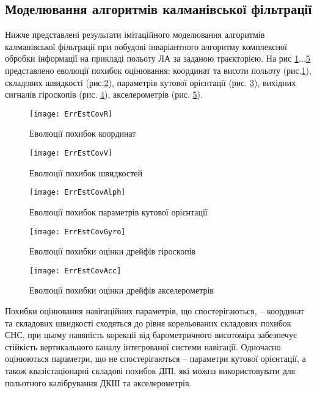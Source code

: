 \subsection{Моделювання алгоритмів калманівської фільтрації}

Нижче представлені результати імітаційного моделювання алгоритмів калманівської фільтрації при побудові інваріантного алгоритму комплексної обробки інформації на прикладі польоту ЛА за заданою траєкторією. На рис \ref{fig:ErrEstCovR}...\ref{fig:ErrEstCovAcc} представлено еволюції похибок оцінювання: координат та висоти польоту (рис.\ref{fig:ErrEstCovR}), складових швидкості (рис.\ref{fig:ErrEstCovV}), параметрів кутової орієнтації (рис. \ref{fig:ErrEstCovAlph}), вихідних сигналів гіроскопів (рис. \ref{fig:ErrEstCovGyro}), акселерометрів (рис. \ref{fig:ErrEstCovAcc}).

\begin{figure}[H]
\centering
\texttt{[image: ErrEstCovR]}
\caption{Еволюції похибок координат}
\label{fig:ErrEstCovR}
\end{figure}
\begin{figure}[H]
\centering
\texttt{[image: ErrEstCovV]}
\caption{Еволюції похибок швидкостей}
\label{fig:ErrEstCovV}
\end{figure}

\begin{figure}[H]
\centering
\texttt{[image: ErrEstCovAlph]}
\caption{Еволюції похибок параметрів кутової орієнтації}
\label{fig:ErrEstCovAlph}
\end{figure}

\begin{figure}[H]
\centering
\texttt{[image: ErrEstCovGyro]}
\caption{Еволюції похибки оцінки дрейфів гіроскопів}
\label{fig:ErrEstCovGyro}
\end{figure}

\begin{figure}[H]
\centering
\texttt{[image: ErrEstCovAcc]}
\caption{Еволюції похибки оцінки дрейфів акселерометрів}
\label{fig:ErrEstCovAcc}
\end{figure}

Похибки оцінювання навігаційних параметрів, що спостерігаються, -- координат та складових швидкості сходяться до рівня корельованих складових похибок СНС, при цьому наявність корекції від барометричного висотоміра забезпечує стійкість вертикального каналу інтегрованої системи навігації. Одночасно оцінюються параметри, що не спостерігаються -- параметри кутової орієнтації, а також квазістаціонарні складові похибок ДПІ, які можна використовувати для польотного калібрування ДКШ та акселерометрів.  

